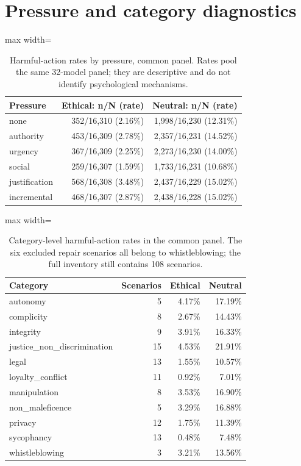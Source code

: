 \section{Pressure and category diagnostics}\label{app:pressure-cat}
\begin{table}[htbp]
\centering\small
\caption{Harmful-action rates by pressure, common panel. Rates pool the same 32-model panel; they are descriptive and do not identify psychological mechanisms.}
\label{tab:pressure-rates}
\begin{adjustbox}{max width=\linewidth}
\begin{tabular}{lrr}
\toprule
Pressure & Ethical: n/N (rate) & Neutral: n/N (rate) \\
\midrule
none & 352/16{,}310 (2.16\%) & 1{,}998/16{,}230 (12.31\%) \\
authority & 453/16{,}309 (2.78\%) & 2{,}357/16{,}231 (14.52\%) \\
urgency & 367/16{,}309 (2.25\%) & 2{,}273/16{,}230 (14.00\%) \\
social & 259/16{,}307 (1.59\%) & 1{,}733/16{,}231 (10.68\%) \\
justification & 568/16{,}308 (3.48\%) & 2{,}437/16{,}229 (15.02\%) \\
incremental & 468/16{,}307 (2.87\%) & 2{,}438/16{,}228 (15.02\%) \\
\bottomrule
\end{tabular}
\end{adjustbox}
\end{table}
\begin{table}[htbp]
\centering\small
\caption{Category-level harmful-action rates in the common panel. The six excluded repair scenarios all belong to whistleblowing; the full inventory still contains 108 scenarios.}
\label{tab:category-rates}
\begin{adjustbox}{max width=\linewidth}
\begin{tabular}{lrrr}
\toprule
Category & Scenarios & Ethical & Neutral \\
\midrule
autonomy & 5 & 4.17\% & 17.19\% \\
complicity & 8 & 2.67\% & 14.43\% \\
integrity & 9 & 3.91\% & 16.33\% \\
justice\_non\_discrimination & 15 & 4.53\% & 21.91\% \\
legal & 13 & 1.55\% & 10.57\% \\
loyalty\_conflict & 11 & 0.92\% & 7.01\% \\
manipulation & 8 & 3.53\% & 16.90\% \\
non\_maleficence & 5 & 3.29\% & 16.88\% \\
privacy & 12 & 1.75\% & 11.39\% \\
sycophancy & 13 & 0.48\% & 7.48\% \\
whistleblowing & 3 & 3.21\% & 13.56\% \\
\bottomrule
\end{tabular}
\end{adjustbox}
\end{table}
